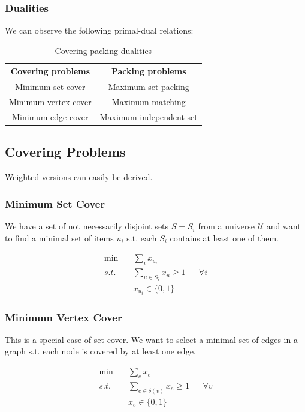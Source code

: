 \subsubsection{Dualities}
We can observe the following primal-dual relations:

\begin{table}[h!]
\begin{center}
\begin{tabular}{c|c}
\textbf{Covering problems} & \textbf{Packing problems}\\
\hline
Minimum set cover &	Maximum set packing\\
Minimum vertex cover & Maximum matching\\
Minimum edge cover & Maximum independent set\\
\end{tabular}
\caption{Covering-packing dualities}
\label{tbl:coveringpackingdualities}
\end{center}
\end{table}
\subsection{Covering Problems}

Weighted versions can easily be derived.

\subsubsection{Minimum Set Cover}

We have a set of not necessarily disjoint sets $S=S_i$ from a universe $\mathcal{U}$ and want to find a minimal set of items $u_i$ s.t. each $S_i$ contains at least one of them.

\begin{align*}
\min \quad & \sum_i x_{u_i}\\
s.t. \quad & \sum_{u\in S_i} x_{u} \geq 1 && \forall i\\
	& x_{u_i} \in \{0,1\}
\end{align*}

\subsubsection{Minimum Vertex Cover}

This is a special case of set cover. We want to select a minimal set of edges in a graph s.t. each node is covered by at least one edge.

\begin{align*}
\min \quad & \sum_e x_e \\
s.t. \quad & \sum_{e\in \delta(v)} x_e \geq 1 && \forall v\\
	& x_{e} \in \{0,1\}
\end{align*}
